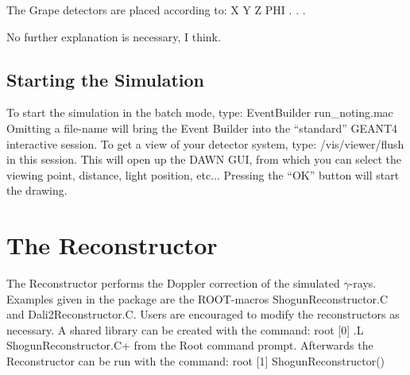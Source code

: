 \documentclass[12pt]{book}
\begin{document}
The Grape detectors are placed according to:\hfill{}
\linebreak
\linebreak
{\ttfamily X Y Z PHI}\linebreak
{\ttfamily .}\linebreak
{\ttfamily .}\linebreak
{\ttfamily .}\linebreak
\linebreak
\linebreak

No further explanation is necessary, I think.

\section{Starting the Simulation}
To start the simulation in the batch mode, type:\hfill{}
\linebreak
\linebreak
{\ttfamily
EventBuilder run\_noting.mac
}
\linebreak
\linebreak
Omitting a file-name will bring the Event Builder into the ``standard'' GEANT4 interactive session. 
To get a view of your detector system, type:\hfill{}
\linebreak
\linebreak
{\ttfamily
/vis/viewer/flush
}
\linebreak
\linebreak
in this session. This will open up the DAWN GUI, from which you can select the viewing point, distance, 
light position, etc... Pressing the ``OK'' button will start the drawing.


\chapter{The Reconstructor}  

The Reconstructor performs the Doppler correction of the simulated $\gamma$-rays.
Examples given in the package are the ROOT-macros
{\ttfamily ShogunReconstructor.C} and {\ttfamily Dali2Reconstructor.C}. Users are 
encouraged to modify the reconstructors as necessary.
A shared library can be created with the command:\hfill{}
\linebreak \linebreak
{\ttfamily root [0] .L ShogunReconstructor.C+
}
\linebreak
\linebreak
from the Root command prompt. Afterwards the Reconstructor can be run with the command:\hfill{}
\linebreak
\linebreak
{\ttfamily root [1] ShogunReconstructor()
}
\linebreak
\linebreak
\end{document}

